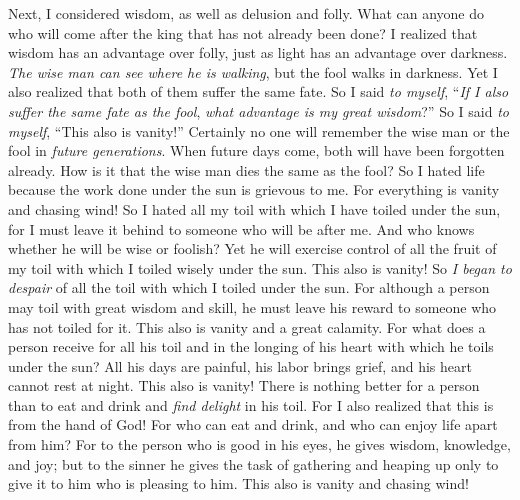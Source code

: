 \begin{biblechapter}
 Next, I considered wisdom, as well as delusion and folly. What can anyone do who will come after the king that has not already been done?
\verse I realized that wisdom has an advantage over folly, just as light has an advantage over darkness.
\verse \textit{The wise man can see where he is walking}, but the fool walks in darkness. Yet I also realized that both of them suffer the same fate.
\verse So I said \textit{to myself}, “\textit{If I also suffer the same fate as the fool}, \textit{what advantage is my great wisdom}?” So I said \textit{to myself}, “This also is vanity!”
\verse Certainly no one will remember the wise man or the fool in \textit{future generations}. When future days come, both will have been forgotten already. How is it that the wise man dies the same as the fool?
\verse So I hated life because the work done under the sun is grievous to me. For everything is vanity and chasing wind!
\verse So I hated all my toil with which I have toiled under the sun, for I must leave it behind to someone who will be after me.
\verse And who knows whether he will be wise or foolish? Yet he will exercise control of all the fruit of my toil with which I toiled wisely under the sun. This also is vanity!
\verse So \textit{I began to despair} of all the toil with which I toiled under the sun.
\verse For although a person may toil with great wisdom and skill, he must leave his reward to someone who has not toiled for it. This also is vanity and a great calamity.
\verse For what does a person receive for all his toil and in the longing of his heart with which he toils under the sun?
\verse All his days are painful, his labor brings grief, and his heart cannot rest at night. This also is vanity!
 There is nothing better for a person than to eat and drink and \textit{find delight} in his toil. For I also realized that this is from the hand of God!
\verse For who can eat and drink, and who can enjoy life apart from him?
\verse For to the person who is good in his eyes, he gives wisdom, knowledge, and joy; but to the sinner he gives the task of gathering and heaping up only to give it to him who is pleasing to him. This also is vanity and chasing wind!
\end{biblechapter}

